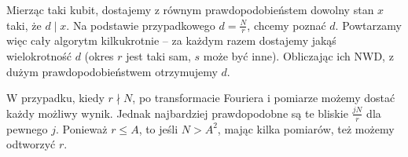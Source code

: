 Mierząc taki kubit, dostajemy z równym prawdopodobieństem dowolny stan \( x \) taki, że \( d \mid x \). Na podstawie przypadkowego \( d = \frac{N}{r} \), chcemy poznać \( d \).
Powtarzamy więc cały algorytm kilkukrotnie -- za każdym razem dostajemy jakąś wielokrotność \( d \) (okres \( r \) jest taki sam, \( s \) może być inne).
Obliczając ich NWD, z dużym prawdopodobieństwem otrzymujemy \( d \).

W przypadku, kiedy \( r \nmid N \), po transformacie Fouriera i pomiarze możemy dostać każdy możliwy wynik. Jednak najbardziej prawdopodobne są te bliskie \( \frac{jN}{r} \) dla pewnego \( j \).
Ponieważ \( r \leq A \), to jeśli \( N > A^2 \), mając kilka pomiarów, też możemy odtworzyć \( r \).